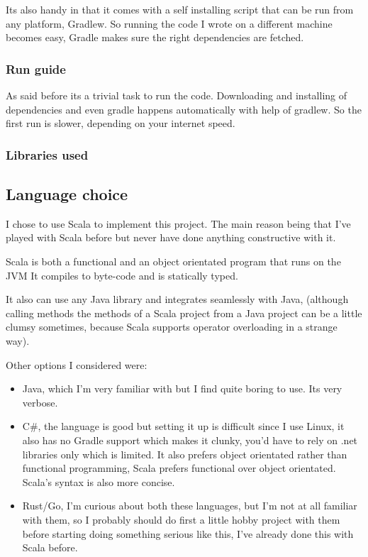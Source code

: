 \documentclass{article}
\begin{document}
Its also handy in that it comes with a self installing script that can be run
from any platform, Gradlew. So running the code I wrote on a different machine
becomes easy, Gradle makes sure the right dependencies are fetched.

\subsubsection{Run guide}
As said before its a trivial task to run the code. Downloading and installing
of dependencies and even gradle happens automatically with help of gradlew.
So the first run is slower, depending on your internet speed.

\subsubsection{Libraries used}

\subsection{Language choice}
I chose to use Scala to implement this project. The main reason being that I've
played with Scala before but never have done anything constructive with it.

Scala is both a functional and an object orientated program that runs on the JVM
It compiles to byte-code and is statically typed.

It also can use any Java library and integrates seamlessly with Java, (although
calling methods the methods of a Scala project from a Java project can be
a little clumsy sometimes, because Scala supports operator overloading in
a strange way).

Other options I considered were:
\begin{itemize}
	\item Java, which I'm very familiar with but I find quite boring to use.
		Its very verbose.
	\item C\#, the language is good but setting it up is difficult since I
		use Linux, it also has no Gradle support which makes it clunky,
		you'd have to rely on .net libraries only which is limited. It
		also prefers object orientated  rather than functional programming,
		Scala prefers functional over object orientated.
		Scala's syntax is also more concise.
	\item Rust/Go, I'm curious about both these languages, but I'm not at
		all familiar with them, so I probably should do first a little
		hobby project with them before starting doing something serious like
		this, I've already done this with Scala before.
\end{itemize}
\end{document}

